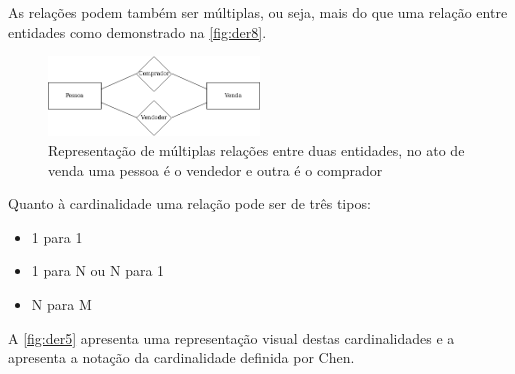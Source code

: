 \documentclass[11pt,twoside,a4paper]{report}
\begin{document}
\newpage
As relações podem também ser múltiplas, ou seja, mais do que uma relação entre entidades como demonstrado na \autoref{fig:der8}.
\begin{figure}[H]
	\begin{center}
		\includegraphics[width=0.5\textwidth]{notacao7} %
		\caption[Representação de múltiplas relações entre duas entidades]{Representação de múltiplas relações entre duas entidades, no ato de venda uma pessoa é o vendedor e outra é o comprador}
		\label{fig:der8}
	\end{center}
\end{figure}
Quanto à cardinalidade uma relação pode ser de três tipos:
\begin{itemize}[noitemsep]
	\item 1 para 1
	\item 1 para N ou N para 1
	\item N para M
\end{itemize}
A \autoref{fig:der5} apresenta uma representação visual destas cardinalidades e a  apresenta a notação da cardinalidade definida por Chen.
\end{document}
